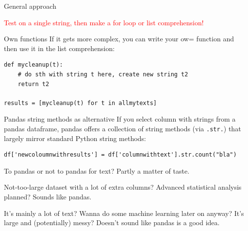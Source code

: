 \documentclass[compress]{beamer}
\begin{document}



\begin{frame}[fragile]{General approach}
\Large

\textcolor{red}{Test on a single string, then make a for loop or list comprehension!}

\pause

\normalsize

\begin{alertblock}{Own functions}
If it gets more complex, you can write your ow= function and then use it in the list comprehension:
\begin{lstlisting}
def mycleanup(t):
    # do sth with string t here, create new string t2
    return t2

results = [mycleanup(t) for t in allmytexts]
\end{lstlisting}
\end{alertblock}
\end{frame}


\begin{frame}[fragile]{Pandas string methods as alternative}
If you select column with strings from a pandas dataframe, pandas offers a collection of string methods (via \texttt{.str.}) that largely mirror standard Python string methods:

\begin{lstlisting}
df['newcoloumnwithresults'] = df['columnwithtext'].str.count("bla")
\end{lstlisting} 


\pause

\begin{alertblock}{To pandas or not to pandas for text?}
Partly a matter of taste. 

Not-too-large dataset with a lot of extra columns? Advanced statistical analysis planned? Sounds like pandas.

It's mainly a lot of text? Wanna do some machine learning later on anyway? It's large and (potentially) messy? Doesn't sound like pandas is a good idea.
\end{alertblock}

\end{frame}



\end{document}
